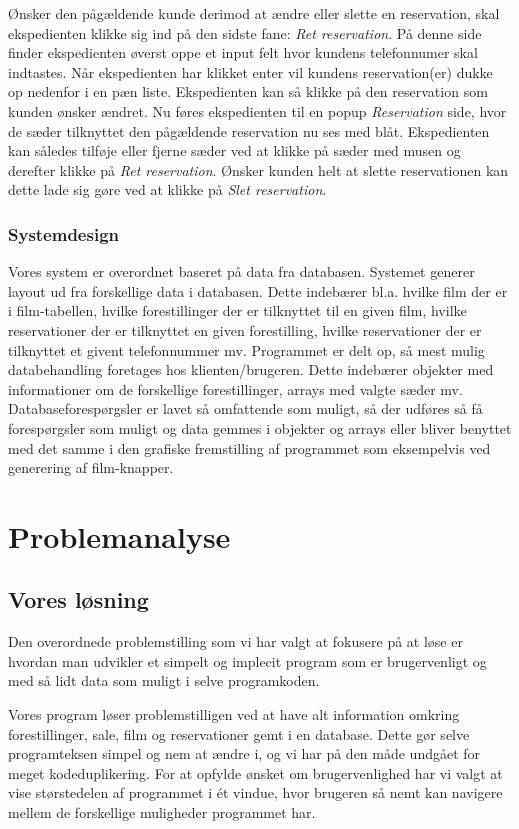 \documentclass[final]{rapport1}
\begin{document}
Ønsker den pågældende kunde derimod at ændre eller slette en reservation, skal ekspedienten klikke sig ind på den sidste fane: \emph{Ret reservation}. På denne side finder ekspedienten øverst oppe et input felt hvor kundens telefonnumer skal indtastes. Når ekspedienten har klikket enter vil kundens reservation(er) dukke op nedenfor i en pæn liste. Ekspedienten kan så klikke på den reservation som kunden ønsker ændret. Nu føres ekspedienten til en popup \emph{Reservation} side, hvor de sæder tilknyttet den pågældende reservation nu ses med blåt. Ekspedienten kan således tilføje eller fjerne sæder ved at klikke på sæder med musen og derefter klikke på \emph{Ret reservation}. Ønsker kunden helt at slette reservationen kan dette lade sig gøre ved at klikke på \emph{Slet reservation}. 

\subsection{Systemdesign}
Vores system er overordnet baseret på data fra databasen. Systemet generer layout ud fra forskellige data i databasen. Dette indebærer bl.a. hvilke film der er i film-tabellen, hvilke forestillinger der er tilknyttet til en given film, hvilke reservationer der er tilknyttet en given forestilling, hvilke reservationer der er tilknyttet et givent telefonnummer mv. Programmet er delt op, så mest mulig databehandling foretages hos klienten/brugeren. Dette indebærer objekter med informationer om de forskellige forestillinger, arrays med valgte sæder mv. Databaseforespørgsler er lavet så omfattende som muligt, så der udføres så få forespørgsler som muligt og data gemmes i objekter og arrays eller bliver benyttet med det samme i den grafiske fremstilling af programmet som eksempelvis ved generering af film-knapper. 


\chapter{Problemanalyse}
\section{Vores løsning}
Den overordnede problemstilling som vi har valgt at fokusere på at løse er hvordan man udvikler et simpelt og implecit program som er brugervenligt og med så lidt data som muligt i selve programkoden.


Vores program løser problemstilligen ved at have alt information omkring forestillinger, sale, film og reservationer gemt i en database. Dette gør selve programteksen simpel og nem at ændre i, og vi har på den måde undgået for meget kodeduplikering. For at opfylde ønsket om brugervenlighed har vi valgt at vise størstedelen af programmet i ét vindue, hvor brugeren så nemt kan navigere mellem de forskellige muligheder programmet har. 
\end{document}
